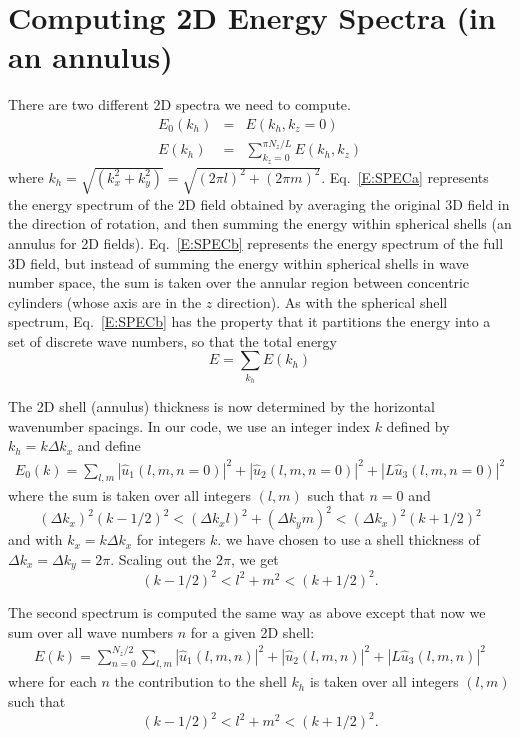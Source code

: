 \documentclass[12pt]{article}
\begin{document}
\section{Computing 2D Energy Spectra (in an annulus)}
There are two different 2D spectra we need to compute. 
\begin{eqnarray}
E_0(k_h) &=& E(k_h, k_z=0) 
\label{E:SPECa} \\
E(k_h) &=& \sum_{k_z=0}^{\pi N_z/L} E(k_h,k_z) 
\label{E:SPECb}
\end{eqnarray}
where $k_h = \sqrt{(k_x^2 + k_y^2)} = \sqrt{(2\pi l)^2 + (2\pi m)^2}$. 
Eq.~\ref{E:SPECa} represents the energy spectrum of the 2D field
obtained by averaging the original 3D field  in the direction of rotation,
and then summing the energy within spherical shells (an annulus for 2D fields).  
Eq.~\ref{E:SPECb} represents
the energy spectrum of the full 3D field, but instead of 
summing the energy within spherical shells in wave number space, the sum is
taken over the annular region between concentric cylinders
(whose axis are in the $z$ direction).  As with the spherical
shell spectrum, Eq.~\ref{E:SPECb} has the property that
it partitions the energy into a set of discrete wave numbers, so
that the total energy 
\[
E = \sum_{k_h} E(k_h)
\]


The 2D shell (annulus) thickness is now
determined by the horizontal wavenumber spacings. In our code,
we use an integer index $k$ defined by $k_h = k \Delta k_x$ and
define
\begin{eqnarray*}
E_0(k) = \sum_{l,m}  |  {\hat u_1}(l,m,n=0) |^2 +
 |  {\hat u_2}(l,m,n=0) |^2 + 
 |  L {\hat u_3}(l,m,n=0) |^2
\end{eqnarray*}
where the sum is taken over all integers $(l,m)$ such that $n=0$ and
\[
(\Delta k_x)^2 (k-1/2)^2 < (\Delta k_x l)^2 + (\Delta k_y m)^2  <  (\Delta k_x)^2 (k+1/2)^2 
\]
and with $k_x=k \Delta k_x$ for integers $k$.  
we have chosen to use a shell thickness of $\Delta k_x = \Delta
k_y = 2\pi$. Scaling out the $2\pi$, we get
\[
(k-1/2)^2 < l^2 + m^2 < (k+1/2)^2.
\]  

The second spectrum is computed the same way as above except that now
we sum over all wave numbers $n$ for a given 2D shell:
\begin{eqnarray}
E(k) = \sum_{n=0}^{N_z/2} \sum_{l,m} |  {\hat u_1}(l,m,n) |^2 +
 |  {\hat u_2}(l,m,n) |^2 + 
 |  L {\hat u_3}(l,m,n) |^2
\end{eqnarray}
where for each $n$ the contribution to the shell $k_h$ is 
taken over all integers $(l,m)$ such that
\[
(k-1/2)^2 < l^2 + m^2 < (k+1/2)^2.
\]  
\end{document}
